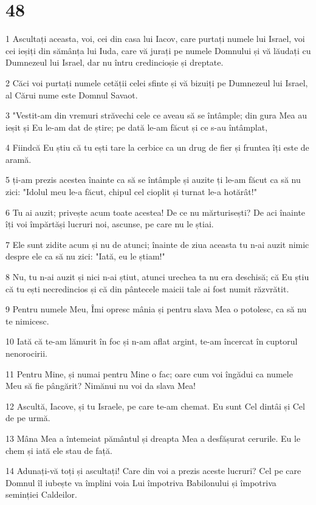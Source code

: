 \chapter{48}

\par 1 Ascultați aceasta, voi, cei din casa lui Iacov, care purtați numele lui Israel, voi cei ieșiți din sămânța lui Iuda, care vă jurați pe numele Domnului și vă lăudați cu Dumnezeul lui Israel, dar nu întru credincioșie și dreptate.
\par 2 Căci voi purtați numele cetății celei sfinte și vă bizuiți pe Dumnezeul lui Israel, al Cărui nume este Domnul Savaot.
\par 3 "Vestit-am din vremuri străvechi cele ce aveau să se întâmple; din gura Mea au ieșit și Eu le-am dat de știre; pe dată le-am făcut și ce s-au întâmplat,
\par 4 Fiindcă Eu știu că tu ești tare la cerbice ca un drug de fier și fruntea îți este de aramă.
\par 5 ți-am prezis acestea înainte ca să se întâmple și auzite ți le-am făcut ca să nu zici: "Idolul meu le-a făcut, chipul cel cioplit și turnat le-a hotărât!"
\par 6 Tu ai auzit; privește acum toate acestea! De ce nu mărturisești? De aci înainte îți voi împărtăși lucruri noi, ascunse, pe care nu le știai.
\par 7 Ele sunt zidite acum și nu de atunci; înainte de ziua aceasta tu n-ai auzit nimic despre ele ca să nu zici: "Iată, eu le știam!"
\par 8 Nu, tu n-ai auzit și nici n-ai știut, atunci urechea ta nu era deschisă; că Eu știu că tu ești necredincios și că din pântecele maicii tale ai fost numit răzvrătit.
\par 9 Pentru numele Meu, Îmi opresc mânia și pentru slava Mea o potolesc, ca să nu te nimicesc.
\par 10 Iată că te-am lămurit în foc și n-am aflat argint, te-am încercat în cuptorul nenorocirii.
\par 11 Pentru Mine, și numai pentru Mine o fac; oare cum voi îngădui ca numele Meu să fie pângărit? Nimănui nu voi da slava Mea!
\par 12 Ascultă, Iacove, și tu Israele, pe care te-am chemat. Eu sunt Cel dintâi și Cel de pe urmă.
\par 13 Mâna Mea a întemeiat pământul și dreapta Mea a desfășurat cerurile. Eu le chem și iată ele stau de față.
\par 14 Adunați-vă toți și ascultați! Care din voi a prezis aceste lucruri? Cel pe care Domnul îl iubește va împlini voia Lui împotriva Babilonului și împotriva seminției Caldeilor.

